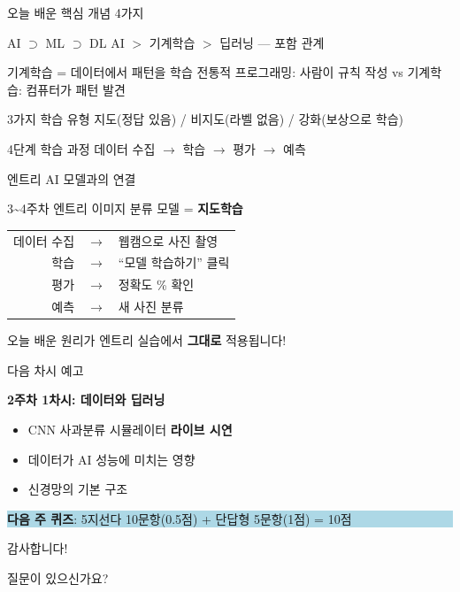 \documentclass[aspectratio=169]{beamer}
\begin{document}
\begin{frame}{오늘 배운 핵심 개념 4가지}
\begin{block}{ AI $\supset$ ML $\supset$ DL}
AI $>$ 기계학습 $>$ 딥러닝 — 포함 관계
\end{block}

\begin{block}{ 기계학습 = 데이터에서 패턴을 학습}
전통적 프로그래밍: 사람이 규칙 작성 vs 기계학습: 컴퓨터가 패턴 발견
\end{block}

\begin{block}{ 3가지 학습 유형}
지도(정답 있음) / 비지도(라벨 없음) / 강화(보상으로 학습)
\end{block}

\begin{block}{ 4단계 학습 과정}
데이터 수집 $\to$ 학습 $\to$ 평가 $\to$ 예측
\end{block}
\end{frame}

\begin{frame}{엔트리 AI 모델과의 연결}
\begin{center}
\Large 3\textasciitilde 4주차 엔트리 이미지 분류 모델 = \textbf{지도학습}
\end{center}
\vspace{0.5cm}
\begin{center}
\begin{tabular}{rcl}
데이터 수집 & $\to$ & 웹캠으로 사진 촬영 \\
학습 & $\to$ & ``모델 학습하기'' 클릭 \\
평가 & $\to$ & 정확도 \% 확인 \\
예측 & $\to$ & 새 사진 분류 \\
\end{tabular}
\end{center}
\vspace{0.5cm}
\begin{center}
\small {} 오늘 배운 원리가 엔트리 실습에서 \textbf{그대로} 적용됩니다!
\end{center}
\end{frame}

\begin{frame}{다음 차시 예고}
\begin{center}
\Large \textbf{2주차 1차시: 데이터와 딥러닝}
\end{center}
\vspace{0.5cm}
\begin{itemize}
    \item CNN 사과분류 시뮬레이터 \textbf{라이브 시연}
    \item 데이터가 AI 성능에 미치는 영향
    \item 신경망의 기본 구조
\end{itemize}
\vspace{0.5cm}
\begin{center}
\colorbox{lightblue}{\parbox{0.7\textwidth}{\centering
{} \textbf{다음 주 퀴즈}: 5지선다 10문항(0.5점) + 단답형 5문항(1점) = 10점}}
\end{center}
\end{frame}

\begin{frame}[standout]
 감사합니다!

\vspace{0.5cm}
질문이 있으신가요?
\end{frame}
\end{document}
